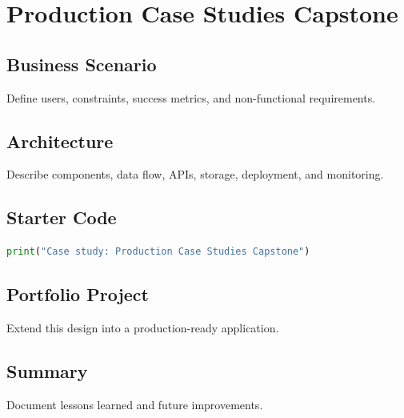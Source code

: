 \chapter{Production Case Studies Capstone}
\label{chap:vol14-10}



\section{Business Scenario}
Define users, constraints, success metrics, and non-functional requirements.

\section{Architecture}
Describe components, data flow, APIs, storage, deployment, and monitoring.

\section{Starter Code}
\begin{lstlisting}[language=Python]
print("Case study: Production Case Studies Capstone")
\end{lstlisting}

\section{Portfolio Project}
Extend this design into a production-ready application.

\section{Summary}
Document lessons learned and future improvements.
